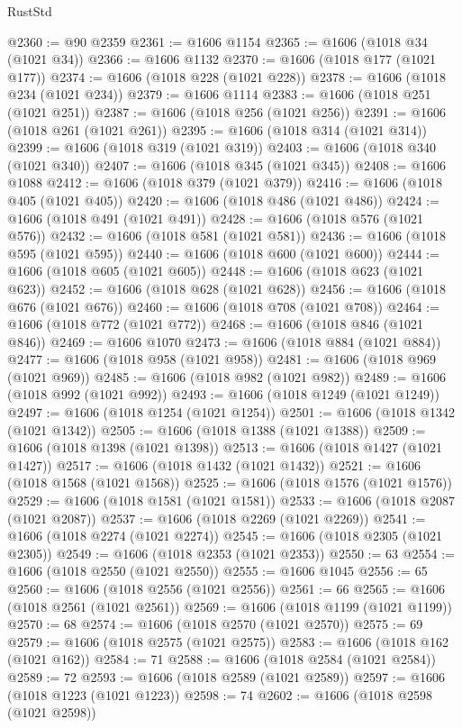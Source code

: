 \begin{lexlean}{RustStd}
\begin{coremodule}
@2360 := @90 @2359
@2361 := @1606 @1154
@2365 := @1606 (@1018 @34 (@1021 @34))
@2366 := @1606 @1132
@2370 := @1606 (@1018 @177 (@1021 @177))
@2374 := @1606 (@1018 @228 (@1021 @228))
@2378 := @1606 (@1018 @234 (@1021 @234))
@2379 := @1606 @1114
@2383 := @1606 (@1018 @251 (@1021 @251))
@2387 := @1606 (@1018 @256 (@1021 @256))
@2391 := @1606 (@1018 @261 (@1021 @261))
@2395 := @1606 (@1018 @314 (@1021 @314))
@2399 := @1606 (@1018 @319 (@1021 @319))
@2403 := @1606 (@1018 @340 (@1021 @340))
@2407 := @1606 (@1018 @345 (@1021 @345))
@2408 := @1606 @1088
@2412 := @1606 (@1018 @379 (@1021 @379))
@2416 := @1606 (@1018 @405 (@1021 @405))
@2420 := @1606 (@1018 @486 (@1021 @486))
@2424 := @1606 (@1018 @491 (@1021 @491))
@2428 := @1606 (@1018 @576 (@1021 @576))
@2432 := @1606 (@1018 @581 (@1021 @581))
@2436 := @1606 (@1018 @595 (@1021 @595))
@2440 := @1606 (@1018 @600 (@1021 @600))
@2444 := @1606 (@1018 @605 (@1021 @605))
@2448 := @1606 (@1018 @623 (@1021 @623))
@2452 := @1606 (@1018 @628 (@1021 @628))
@2456 := @1606 (@1018 @676 (@1021 @676))
@2460 := @1606 (@1018 @708 (@1021 @708))
@2464 := @1606 (@1018 @772 (@1021 @772))
@2468 := @1606 (@1018 @846 (@1021 @846))
@2469 := @1606 @1070
@2473 := @1606 (@1018 @884 (@1021 @884))
@2477 := @1606 (@1018 @958 (@1021 @958))
@2481 := @1606 (@1018 @969 (@1021 @969))
@2485 := @1606 (@1018 @982 (@1021 @982))
@2489 := @1606 (@1018 @992 (@1021 @992))
@2493 := @1606 (@1018 @1249 (@1021 @1249))
@2497 := @1606 (@1018 @1254 (@1021 @1254))
@2501 := @1606 (@1018 @1342 (@1021 @1342))
@2505 := @1606 (@1018 @1388 (@1021 @1388))
@2509 := @1606 (@1018 @1398 (@1021 @1398))
@2513 := @1606 (@1018 @1427 (@1021 @1427))
@2517 := @1606 (@1018 @1432 (@1021 @1432))
@2521 := @1606 (@1018 @1568 (@1021 @1568))
@2525 := @1606 (@1018 @1576 (@1021 @1576))
@2529 := @1606 (@1018 @1581 (@1021 @1581))
@2533 := @1606 (@1018 @2087 (@1021 @2087))
@2537 := @1606 (@1018 @2269 (@1021 @2269))
@2541 := @1606 (@1018 @2274 (@1021 @2274))
@2545 := @1606 (@1018 @2305 (@1021 @2305))
@2549 := @1606 (@1018 @2353 (@1021 @2353))
@2550 := 63
@2554 := @1606 (@1018 @2550 (@1021 @2550))
@2555 := @1606 @1045
@2556 := 65
@2560 := @1606 (@1018 @2556 (@1021 @2556))
@2561 := 66
@2565 := @1606 (@1018 @2561 (@1021 @2561))
@2569 := @1606 (@1018 @1199 (@1021 @1199))
@2570 := 68
@2574 := @1606 (@1018 @2570 (@1021 @2570))
@2575 := 69
@2579 := @1606 (@1018 @2575 (@1021 @2575))
@2583 := @1606 (@1018 @162 (@1021 @162))
@2584 := 71
@2588 := @1606 (@1018 @2584 (@1021 @2584))
@2589 := 72
@2593 := @1606 (@1018 @2589 (@1021 @2589))
@2597 := @1606 (@1018 @1223 (@1021 @1223))
@2598 := 74
@2602 := @1606 (@1018 @2598 (@1021 @2598))

\end{coremodule}
\end{lexlean}
